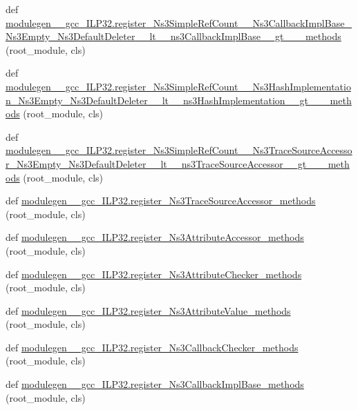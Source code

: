 \begin{DoxyCompactItemize}
\item 
def \hyperlink{namespacemodulegen____gcc__ILP32_a1725745354fc64e505a347b59ad09428}{modulegen\+\_\+\+\_\+gcc\+\_\+\+I\+L\+P32.\+register\+\_\+\+Ns3\+Simple\+Ref\+Count\+\_\+\+\_\+\+Ns3\+Callback\+Impl\+Base\+\_\+\+Ns3\+Empty\+\_\+\+Ns3\+Default\+Deleter\+\_\+\+\_\+lt\+\_\+\+\_\+ns3\+Callback\+Impl\+Base\+\_\+\+\_\+gt\+\_\+\+\_\+\+\_\+methods} (root\+\_\+module, cls)
\item 
def \hyperlink{namespacemodulegen____gcc__ILP32_a59dad6cf46a3eb90ab74f8388a4708b9}{modulegen\+\_\+\+\_\+gcc\+\_\+\+I\+L\+P32.\+register\+\_\+\+Ns3\+Simple\+Ref\+Count\+\_\+\+\_\+\+Ns3\+Hash\+Implementation\+\_\+\+Ns3\+Empty\+\_\+\+Ns3\+Default\+Deleter\+\_\+\+\_\+lt\+\_\+\+\_\+ns3\+Hash\+Implementation\+\_\+\+\_\+gt\+\_\+\+\_\+\+\_\+methods} (root\+\_\+module, cls)
\item 
def \hyperlink{namespacemodulegen____gcc__ILP32_a54ea4c3c62de90cf295c66cffbc336c8}{modulegen\+\_\+\+\_\+gcc\+\_\+\+I\+L\+P32.\+register\+\_\+\+Ns3\+Simple\+Ref\+Count\+\_\+\+\_\+\+Ns3\+Trace\+Source\+Accessor\+\_\+\+Ns3\+Empty\+\_\+\+Ns3\+Default\+Deleter\+\_\+\+\_\+lt\+\_\+\+\_\+ns3\+Trace\+Source\+Accessor\+\_\+\+\_\+gt\+\_\+\+\_\+\+\_\+methods} (root\+\_\+module, cls)
\item 
def \hyperlink{namespacemodulegen____gcc__ILP32_a3451d08858386f1fa04131d165c83ba0}{modulegen\+\_\+\+\_\+gcc\+\_\+\+I\+L\+P32.\+register\+\_\+\+Ns3\+Trace\+Source\+Accessor\+\_\+methods} (root\+\_\+module, cls)
\item 
def \hyperlink{namespacemodulegen____gcc__ILP32_a8f1258b8ab8ec43af174fc3ff9198eb6}{modulegen\+\_\+\+\_\+gcc\+\_\+\+I\+L\+P32.\+register\+\_\+\+Ns3\+Attribute\+Accessor\+\_\+methods} (root\+\_\+module, cls)
\item 
def \hyperlink{namespacemodulegen____gcc__ILP32_a891dd82b08e1260e01670cf52c90138c}{modulegen\+\_\+\+\_\+gcc\+\_\+\+I\+L\+P32.\+register\+\_\+\+Ns3\+Attribute\+Checker\+\_\+methods} (root\+\_\+module, cls)
\item 
def \hyperlink{namespacemodulegen____gcc__ILP32_a7475be8fb4d2d4611c513f6d21c50a32}{modulegen\+\_\+\+\_\+gcc\+\_\+\+I\+L\+P32.\+register\+\_\+\+Ns3\+Attribute\+Value\+\_\+methods} (root\+\_\+module, cls)
\item 
def \hyperlink{namespacemodulegen____gcc__ILP32_acf2267ead3a407631a6fe495c0560d6b}{modulegen\+\_\+\+\_\+gcc\+\_\+\+I\+L\+P32.\+register\+\_\+\+Ns3\+Callback\+Checker\+\_\+methods} (root\+\_\+module, cls)
\item 
def \hyperlink{namespacemodulegen____gcc__ILP32_a9a85026102c692583453c9b637b8b837}{modulegen\+\_\+\+\_\+gcc\+\_\+\+I\+L\+P32.\+register\+\_\+\+Ns3\+Callback\+Impl\+Base\+\_\+methods} (root\+\_\+module, cls)

\end{DoxyCompactItemize}
